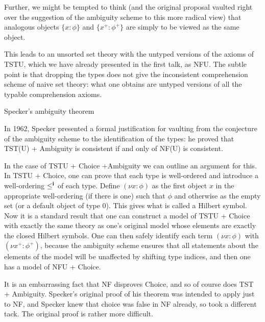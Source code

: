 \documentclass{slides}
\begin{document}
\begin{slide}

Further, we might be tempted to think (and the original proposal vaulted right over the suggestion of the ambiguity scheme to this more radical view) that
analogous objects $\{x:\phi\}$ and $\{x^+:\phi^+\}$ are simply to be viewed as the same object.

This leads to an unsorted set theory with the untyped versions of the axioms of TSTU, which we have already presented in the first talk, as NFU.  The subtle point is that
dropping the types does not give the inconsistent comprehension scheme of naive set theory:  what one obtains are untyped versions of all the typable comprehension axioms.


\end{slide}

\begin{slide}

{\Large Specker's ambiguity theorem}

In 1962, Specker presented a formal justification for vaulting from the conjecture of the ambiguity scheme to the identification of the types:  he proved that
TST(U) + Ambiguity is consistent if and only of NF(U) is consistent.

\end{slide}

\begin{slide}

In the case of TSTU + Choice  +Ambiguity we can outline an argument for this.  In TSTU + Choice, one can prove that each type is well-ordered and introduce a well-ordering
$\leq^{\bf i}$ of each type.  Define $(\nu x:\phi)$ as the first object $x$ in the appropriate well-ordering (if there is one) such that $\phi$ and otherwise as the empty set
(or a default object of type 0).  This gives what is called a Hilbert symbol.  Now it is a standard result that one can construct a model of TSTU + Choice with exactly the same theory as one's original model whose elements are exactly the closed Hilbert symbols.  One can then safely identify each term $(\nu x:\phi)$ with $(\nu x^+:\phi^+)$, because the ambiguity scheme ensures that all statements about the elements of the model will be unaffected by shifting type indices, and then one has a model of NFU + Choice.


\end{slide}

\begin{slide}

It is an embarrassing fact that NF disproves Choice, and so of course does TST + Ambiguity.  Specker's original proof of his theorem was intended to apply just to NF, and Specker knew that choice was false in NF already, so took a different tack.  The original proof is rather more difficult.

\end{slide}
\end{document}
